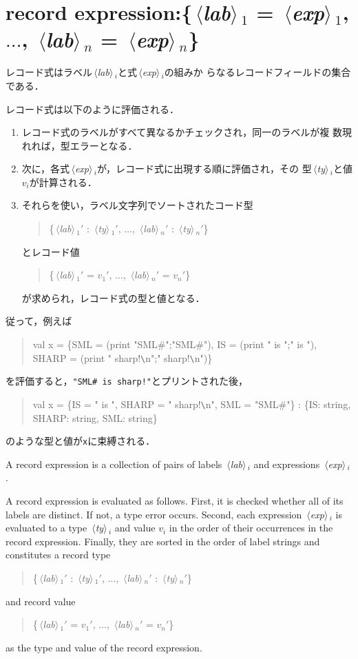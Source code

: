 \documentclass{jbook}
\newcommand{\txt}[2]{#2}
\newcommand{\code}[1]{\mbox{\large\tt #1}}
\newcommand{\nonterm}[1]{\mbox{$\,\langle$}{\it #1}\mbox{$\rangle\,$}}
\newenvironment{program}{\begin{quote}\begin{tt}}%
                        {\end{tt}\end{quote}}
\begin{document}
\section{\txt{レコード式}{record expression}:\{\nonterm{lab}$_1$ = \nonterm{exp}$_1$, $\ldots$, \nonterm{lab}$_n$ = \nonterm{exp}$_n$\}}

\ifjp%

	レコード式はラベル\nonterm{lab}$_i$と式\nonterm{exp}$_i$の組みか
らなるレコードフィールドの集合である．

	レコード式は以下のように評価される．
\begin{enumerate}
\item レコード式のラベルがすべて異なるかチェックされ，同一のラベルが複
数現れれば，型エラーとなる．
\item 次に，各式\nonterm{exp}$_i$が，レコード式に出現する順に評価され，その
型\nonterm{ty}$_i$と値$v_i$が計算される．
\item それらを使い，ラベル文字列でソートされたコード型
\begin{program}
\{\nonterm{lab}$_1'$ : \nonterm{ty}$_1'$, $\ldots$, \nonterm{lab}$_n'$ : \nonterm{ty}$_n'$\}
\end{program}
とレコード値
\begin{program}
\{\nonterm{lab}$_1'$ = $v_1'$, $\ldots$, \nonterm{lab}$_n'$ = $v_n'$\}
\end{program}
が求められ，レコード式の型と値となる．
\end{enumerate}

	従って，例えば
\begin{program}
val x = \{SML = (print "SML\#";"SML\#"), 
          IS = (print " is ";" is "),
          SHARP = (print " sharp!\verb|\|n";" sharp!\verb|\|n")\}
\end{program}
を評価すると，\code{"SML\# is sharp!"}とプリントされた後，
\begin{program}
val x = \{IS = " is ", SHARP = " sharp!\verb|\|n", SML = "SML\#"\} : \{IS: string, SHARP: string, SML: string\}
\end{program}
のような型と値が\code{x}に束縛される．

\else%
	A record expression is a collection of pairs of labels
\nonterm{lab}$_i$ and expressions \nonterm{exp}$_i$.

	A record expression is evaluated as follows.
	First, it is checked whether all of its labels are distinct.
	If not, a type error occurs.
	Second,
each expression \nonterm{exp}$_i$ is evaluated to a
type \nonterm{ty}$_i$ and value $v_i$ in
the order of their occurrences in the record expression.
	Finally, they are sorted in the order of label strings and
constitutes a record type
\begin{program}
\{\nonterm{lab}$_1'$ : \nonterm{ty}$_1'$, $\ldots$, \nonterm{lab}$_n'$ : \nonterm{ty}$_n'$\}
\end{program}
and record value
\begin{program}
\{\nonterm{lab}$_1'$ = $v_1'$, $\ldots$, \nonterm{lab}$_n'$ = $v_n'$\}
\end{program}
as the type and value of the record expression.
\end{document}
